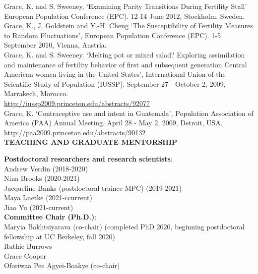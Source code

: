 \documentclass[11pt]{article} %
\begin{document}
\noindent
Grace, K. and S. Sweeney, `Examining Parity Transitions During Fertility Stall' European Population Conference (EPC). 12-14 June 2012, Stockholm, Sweden.\\

\noindent
Grace, K.,  J. Goldstein and Y.-H. Cheng `The Susceptibility of Fertility Measures to Random Fluctuations', European Population Conference (EPC). 1-5 September 2010, Vienna, Austria. \\

\noindent
Grace, K. and S. Sweeney. `Melting pot or mixed salad? Exploring assimilation and 
maintenance of fertility behavior of first and subsequent generation Central American 
women living in the United States', International Union of the Scientific Study of 
Population (IUSSP). September 27 - October 2, 2009, Marrakech, Morocco. \\
\url{http://iussp2009.princeton.edu/abstracts/92077}\\


\noindent
Grace, K. `Contraceptive use and intent in Guatemala', Population Association of 
America (PAA) Annual Meeting. April 28 - May 2, 2009, Detroit, USA.\\
\url{http://paa2009.princeton.edu/abstracts/90132}\\



\noindent
{\large \textbf{TEACHING AND GRADUATE MENTORSHIP}}
\vspace{.5cm}

\noindent
\textbf{Postdoctoral researchers and research scientists}:\\
Andrew Verdin (2018-2020)\\
Nina Brooks (2020-2021)\\
Jacqueline Banks (postdoctoral trainee MPC) (2019-2021)\\
Maya Luetke (2021-ccurrent)\\
Jiao Yu (2021-current)\\


\noindent
\textbf{Committee Chair (Ph.D.)}: \\
Maryia Bakhtsiyarava (co-chair) (completed PhD 2020, beginning postdoctoral fellowship at UC Berkeley, fall 2020)\\
Ruthie Burrows\\
Grace Cooper\\
Oforiwaa Pee Agyei-Boakye (co-chair)\\
\end{document}
